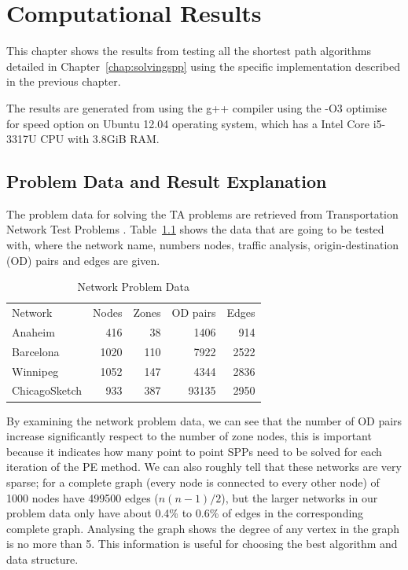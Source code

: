 \chapter{Computational Results}\label{chap:results}

This chapter shows the results from testing all the shortest path algorithms detailed in Chapter~\ref{chap:solvingspp} using the specific implementation described in the previous chapter.

The results are generated from using the g++ compiler using the -O3 optimise for speed option on Ubuntu 12.04 operating system, which has a Intel Core i5-3317U CPU with 3.8GiB RAM.

\section{Problem Data and Result Explanation}
The problem data for solving the TA problems are retrieved from Transportation Network Test Problems \citep{ProblemData}.
Table~\ref{table:problemdata} shows the data that are going to be tested with,
where the network name, numbers nodes, traffic analysis, origin-destination (OD) pairs and edges are given.
\begin{table}[H]
    \centering
    \begin{tabular}{lrrrr} \toprule
        Network & Nodes & Zones & OD pairs & Edges \\ \cmidrule(lr){1-5}
        Anaheim       & 416  & 38  & 1406  & 914  \\
        Barcelona     & 1020 & 110 & 7922  & 2522 \\
        Winnipeg      & 1052 & 147 & 4344  & 2836 \\
        ChicagoSketch & 933  & 387 & 93135 & 2950 \\ \bottomrule
    \end{tabular}
    \caption{Network Problem Data}
    \label{table:problemdata}
\end{table}
By examining the network problem data,
we can see that the number of OD pairs increase
significantly respect to the number of zone nodes,
this is important because it indicates how many point to point SPPs need to be solved for each iteration of the PE method.
We can also roughly tell that these networks are very sparse;
for a complete graph (every node is connected to every other node) of 1000 nodes have 499500 edges ($n(n-1)/2$),
but the larger networks in our problem data only have about 0.4\% to 0.6\% of edges in the corresponding complete graph. 
Analysing the graph shows the degree of any vertex in the graph is no more than 5.
This information is useful for choosing the best algorithm and data structure.

